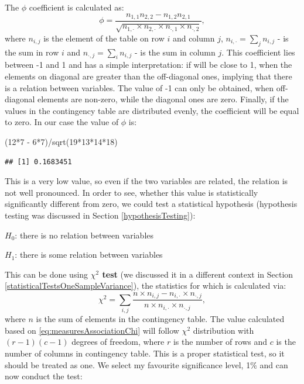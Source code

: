 \documentclass[
]{book}
\newenvironment{Shaded}{\begin{snugshade}}{\end{snugshade}}
\newcommand{\DecValTok}[1]{\textcolor[rgb]{0.00,0.00,0.81}{#1}}
\newcommand{\FunctionTok}[1]{\textcolor[rgb]{0.00,0.00,0.00}{#1}}
\newcommand{\NormalTok}[1]{#1}
\newcommand{\SpecialCharTok}[1]{\textcolor[rgb]{0.00,0.00,0.00}{#1}}
\theoremstyle{definition}
\theoremstyle{definition}
\theoremstyle{definition}
\theoremstyle{definition}
\theoremstyle{remark}
\begin{document}
The \(\phi\) coefficient is calculated as:
\begin{equation}
    \phi = \frac{n_{1,1} n_{2,2} - n_{1,2} n_{2,1}}{\sqrt{n_{1,\cdot}\times n_{2,\cdot}\times n_{\cdot,1}\times n_{\cdot,2}}} ,
    \label{eq:measuresAssociationPhi}
\end{equation}
where \(n_{i,j}\) is the element of the table on row \(i\) and column \(j\), \(n_{i,\cdot}=\sum_{j}n_{i,j}\) - is the sum in row \(i\) and \(n_{\cdot,j}=\sum_{i} n_{i,j}\) - is the sum in column \(j\). This coefficient lies between -1 and 1 and has a simple interpretation: if will be close to 1, when the elements on diagonal are greater than the off-diagonal ones, implying that there is a relation between variables. The value of -1 can only be obtained, when off-diagonal elements are non-zero, while the diagonal ones are zero. Finally, if the values in the contingency table are distributed evenly, the coefficient will be equal to zero. In our case the value of \(\phi\) is:

\begin{Shaded}
\begin{Highlighting}[]
\NormalTok{(}\DecValTok{12}\SpecialCharTok{*}\DecValTok{7} \SpecialCharTok{{-}} \DecValTok{6}\SpecialCharTok{*}\DecValTok{7}\NormalTok{)}\SpecialCharTok{/}\FunctionTok{sqrt}\NormalTok{(}\DecValTok{19}\SpecialCharTok{*}\DecValTok{13}\SpecialCharTok{*}\DecValTok{14}\SpecialCharTok{*}\DecValTok{18}\NormalTok{)}
\end{Highlighting}
\end{Shaded}

\begin{verbatim}
## [1] 0.1683451
\end{verbatim}

This is a very low value, so even if the two variables are related, the relation is not well pronounced. In order to see, whether this value is statistically significantly different from zero, we could test a statistical hypothesis (hypothesis testing was discussed in Section \ref{hypothesisTesting}):

\(H_0\): there is no relation between variables

\(H_1\): there is some relation between variables

This can be done using \textbf{\(\chi^2\) test} (we discussed it in a different context in Section \ref{statisticalTestsOneSampleVariance}), the statistics for which is calculated via:
\begin{equation}
    \chi^2 = \sum_{i,j} \frac{n \times n_{i,j} - n_{i,\cdot} \times n_{\cdot,j}}{n \times n_{i,\cdot} \times n_{\cdot,j}} ,
    \label{eq:measuresAssociationChi}
\end{equation}
where \(n\) is the sum of elements in the contingency table. The value calculated based on \eqref{eq:measuresAssociationChi} will follow \(\chi^2\) distribution with \((r-1)(c-1)\) degrees of freedom, where \(r\) is the number of rows and \(c\) is the number of columns in contingency table. This is a proper statistical test, so it should be treated as one. We select my favourite significance level, 1\% and can now conduct the test:
\end{document}
